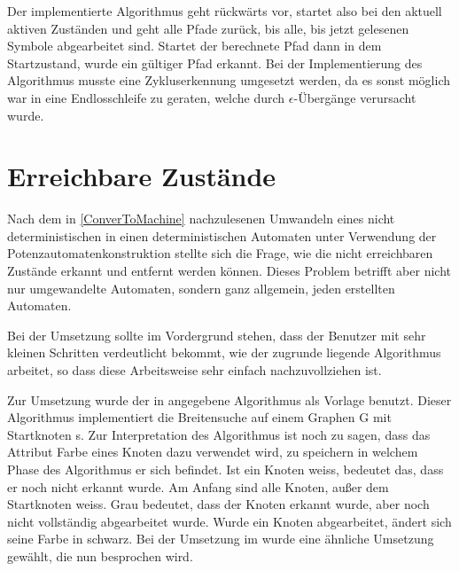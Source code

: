 Der implementierte Algorithmus geht rückwärts vor, startet also bei den aktuell
aktiven Zuständen und geht alle Pfade zurück, bis alle, bis jetzt gelesenen
Symbole abgearbeitet sind. Startet der berechnete Pfad dann in dem
Startzustand, wurde ein gültiger Pfad erkannt. Bei der Implementierung des
Algorithmus musste eine Zykluserkennung umgesetzt werden, da es sonst möglich
war in eine Endlosschleife zu geraten, welche durch $\epsilon$-Übergänge
verursacht wurde.\vspace{10pt}


\section{Erreichbare Zustände}\label{ReachableStates}

Nach dem in \ref{ConverToMachine} nachzulesenen Umwandeln eines nicht
deterministischen in einen deterministischen Automaten unter Verwendung der
Potenzautomatenkonstruktion stellte sich die Frage, wie die nicht erreichbaren
Zustände erkannt und entfernt werden können. Dieses Problem betrifft aber nicht
nur umgewandelte Automaten, sondern ganz allgemein, jeden erstellten
Automaten.\vspace{10pt}

Bei der Umsetzung sollte im Vordergrund stehen, dass der Benutzer mit sehr
kleinen Schritten verdeutlicht bekommt, wie der zugrunde liegende Algorithmus
arbeitet, so dass diese Arbeitsweise sehr einfach nachzuvollziehen
ist.\vspace{10pt}

Zur Umsetzung wurde der in \cite[S. 536]{Algorithmen} angegebene Algorithmus
als Vorlage benutzt. Dieser Algorithmus implementiert die Breitensuche auf
einem Graphen G mit Startknoten s. Zur Interpretation des Algorithmus ist noch
zu sagen, dass das Attribut Farbe eines Knoten dazu verwendet wird, zu
speichern in welchem Phase des Algorithmus er sich befindet. Ist ein Knoten
weiss, bedeutet das, dass er noch nicht erkannt wurde. Am Anfang sind alle
Knoten, außer dem Startknoten weiss. Grau bedeutet, dass der Knoten erkannt
wurde, aber noch nicht vollständig abgearbeitet wurde. Wurde ein Knoten
abgearbeitet, ändert sich seine Farbe in schwarz. Bei der Umsetzung im \gtitool
wurde eine ähnliche Umsetzung gewählt, die nun besprochen wird.\vspace{10pt}

